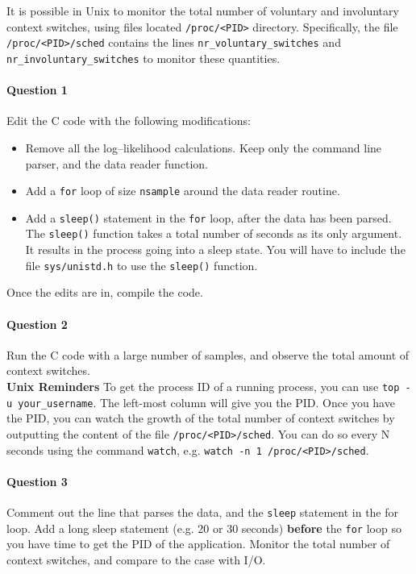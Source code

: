 \documentclass[letterpaper,10pt]{article}
\begin{document}
It is possible in Unix to monitor the total number of voluntary and involuntary context switches, using files located \texttt{/proc/<PID>} directory. Specifically, the file \texttt{/proc/<PID>/sched} contains the lines \texttt{nr\_voluntary\_switches} and \texttt{nr\_involuntary\_switches} 
to monitor these quantities. 

\paragraph{Question 1} Edit the C code with the following modifications:
\begin{itemize}
 \item Remove all the log--likelihood calculations. Keep only the command line parser, and the data reader function.
 \item Add a \texttt{for} loop of size \texttt{nsample} around the data reader routine.
 \item Add a \texttt{sleep()} statement in the \texttt{for} loop, after the data has been parsed. The \texttt{sleep()} function takes a total number of seconds as its only argument. It results in the process going into a sleep state. 
You will have to include the file \texttt{sys/unistd.h} to use the \texttt{sleep()} function.
\end{itemize}
Once the edits are in, compile the code.


\paragraph{Question 2} Run the C code with a large number of samples, and observe the total amount of context switches. 
\newline
~\\
\textbf{Unix Reminders}
To get the process ID of a running process, you can use \texttt{top -u your\_username}. The left-most column will give you the PID. Once you have the PID, you can watch the growth of the total number of context switches by outputting the content of the file \texttt{/proc/<PID>/sched}. You can
do so every N seconds using the command \texttt{watch}, e.g. \texttt{watch -n 1 /proc/<PID>/sched}.


\paragraph{Question 3} Comment out the line that parses the data, and the \texttt{sleep} statement in the for loop. Add a long sleep statement (e.g. 20 or 30 seconds) \textbf{before} the \texttt{for} loop so you have time to get the PID of the application. Monitor the total number of context
switches, and compare to the case with I/O.
\end{document}
